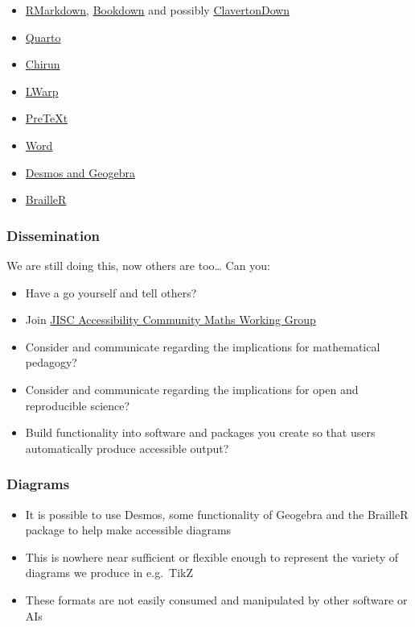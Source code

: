 \documentclass[
  letterpaper,
  DIV=11,
  numbers=noendperiod]{scrartcl}
\providecommand{\tightlist}{%
  \setlength{\itemsep}{0pt}\setlength{\parskip}{0pt}}\usepackage{longtable,booktabs,array}
\begin{document}
\begin{itemize}
\tightlist
\item
  \href{https://stem-enable.github.io/RMarkdownWorkshop/}{RMarkdown},
  \href{https://bookdown.org/}{Bookdown} and possibly
  \href{https://bathmash.github.io/clavertondown/}{ClavertonDown}
\item
  \href{https://quarto.org/}{Quarto}
\item
  \href{https://chirun.org.uk/}{Chirun}
\item
  \href{https://people.bath.ac.uk/feb/lwarp/lwarp-intro.html}{LWarp}
\item
  \href{https://pretextbook.org/}{PreTeXt}
\item
  \href{https://stem-enable.github.io/WordWorkshop/}{Word}
\item
  \href{https://bathmash.github.io/CETL-MSOR-2022-Beyond-alt-text/}{Desmos
  and Geogebra}
\item
  \href{https://r-resources.massey.ac.nz/BrailleR/}{BrailleR}
\end{itemize}

\subsubsection{Dissemination}\label{dissemination}

We are still doing this, now others are too\ldots{} Can you:

\begin{itemize}
\tightlist
\item
  Have a go yourself and tell others?
\item
  Join \href{https://github.com/A11yMaths}{JISC Accessibility Community
  Maths Working Group}
\item
  Consider and communicate regarding the implications for mathematical
  pedagogy?
\item
  Consider and communicate regarding the implications for open and
  reproducible science?
\item
  Build functionality into software and packages you create so that
  users automatically produce accessible output?
\end{itemize}

\subsubsection{Diagrams}\label{diagrams}

\begin{itemize}
\tightlist
\item
  It is possible to use Desmos, some functionality of Geogebra and the
  BrailleR package to help make accessible diagrams
\item
  This is nowhere near sufficient or flexible enough to represent the
  variety of diagrams we produce in e.g.~TikZ
\item
  These formats are not easily consumed and manipulated by other
  software or AIs
\end{itemize}
\end{document}

